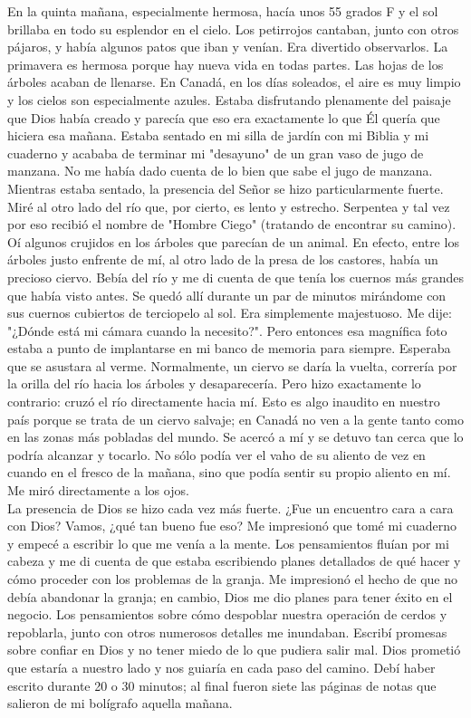\documentclass[twoside, 12pt]{book}
\begin{document}
En la quinta mañana, especialmente hermosa, hacía unos 55 grados F y el sol brillaba en todo su esplendor en el cielo. Los petirrojos cantaban, junto con otros pájaros, y había algunos patos que iban y venían. Era divertido observarlos. La primavera es hermosa porque hay nueva vida en todas partes. Las hojas de los árboles acaban de llenarse. En Canadá, en los días soleados, el aire es muy limpio y los cielos son especialmente azules. Estaba disfrutando plenamente del paisaje que Dios había creado y parecía que eso era exactamente lo que Él quería que hiciera esa mañana. Estaba sentado en mi silla de jardín con mi Biblia y mi cuaderno y acababa de terminar mi "desayuno" de un gran vaso de jugo de manzana. No me había dado cuenta de lo bien que sabe el jugo de manzana. Mientras estaba sentado, la presencia del Señor se hizo particularmente fuerte. Miré al otro lado del río que, por cierto, es lento y estrecho. Serpentea y tal vez por eso recibió el nombre de "Hombre Ciego" (tratando de encontrar su camino). Oí algunos crujidos en los árboles que parecían de un animal. En efecto, entre los árboles justo enfrente de mí, al otro lado de la presa de los castores, había un precioso ciervo. Bebía del río y me di cuenta de que tenía los cuernos más grandes que había visto antes. Se quedó allí durante un par de minutos mirándome con sus cuernos cubiertos de terciopelo al sol. Era simplemente majestuoso. Me dije: "¿Dónde está mi cámara cuando la necesito?". Pero entonces esa magnífica foto estaba a punto de implantarse en mi banco de memoria para siempre. Esperaba que se asustara al verme. Normalmente, un ciervo se daría la vuelta, correría por la orilla del río hacia los árboles y desaparecería. Pero hizo exactamente lo contrario: cruzó el río directamente hacia mí. Esto es algo inaudito en nuestro país porque se trata de un ciervo salvaje; en Canadá no ven a la gente tanto como en las zonas más pobladas del mundo. Se acercó a mí y se detuvo tan cerca que lo podría alcanzar y tocarlo. No sólo podía ver el vaho de su aliento de vez en cuando en el fresco de la mañana, sino que podía sentir su propio aliento en mí. Me miró directamente a los ojos.\\

La presencia de Dios se hizo cada vez más fuerte. ¿Fue un encuentro cara a cara con Dios? Vamos, ¿qué tan bueno fue eso? Me impresionó que tomé mi cuaderno y empecé a escribir lo que me venía a la mente. Los pensamientos fluían por mi cabeza y me di cuenta de que estaba escribiendo planes detallados de qué hacer y cómo proceder con los problemas de la granja. Me impresionó el hecho de que no debía abandonar la granja; en cambio, Dios me dio planes para tener éxito en el negocio. Los pensamientos sobre cómo despoblar nuestra operación de cerdos y repoblarla, junto con otros numerosos detalles me inundaban. Escribí promesas sobre confiar en Dios y no tener miedo de lo que pudiera salir mal. Dios prometió que estaría a nuestro lado y nos guiaría en cada paso del camino. Debí haber escrito durante 20 o 30 minutos; al final fueron siete las páginas de notas que salieron de mi bolígrafo aquella mañana.\\
\end{document}
